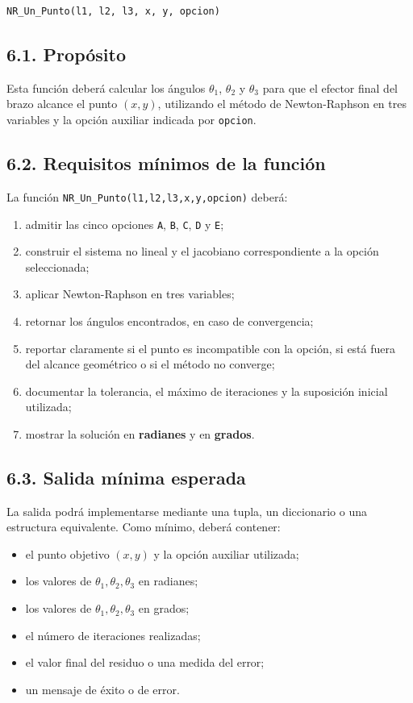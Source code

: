\documentclass[12pt]{article}
\begin{document}
\begin{lstlisting}[language=Python]
NR_Un_Punto(l1, l2, l3, x, y, opcion)
\end{lstlisting}

\subsection*{6.1. Propósito}

Esta función deberá calcular los ángulos \(\theta_1\), \(\theta_2\) y \(\theta_3\) para que el efector final del brazo alcance el punto \((x,y)\), utilizando el método de Newton-Raphson en tres variables y la opción auxiliar indicada por \texttt{opcion}.

\subsection*{6.2. Requisitos mínimos de la función}

La función \texttt{NR\_Un\_Punto(l1,l2,l3,x,y,opcion)} deberá:

\begin{enumerate}[label=\alph*)]
    \item admitir las cinco opciones \texttt{A}, \texttt{B}, \texttt{C}, \texttt{D} y \texttt{E};
    \item construir el sistema no lineal y el jacobiano correspondiente a la opción seleccionada;
    \item aplicar Newton-Raphson en tres variables;
    \item retornar los ángulos encontrados, en caso de convergencia;
    \item reportar claramente si el punto es incompatible con la opción, si está fuera del alcance geométrico o si el método no converge;
    \item documentar la tolerancia, el máximo de iteraciones y la suposición inicial utilizada;
    \item mostrar la solución en \textbf{radianes} y en \textbf{grados}.
\end{enumerate}

\subsection*{6.3. Salida mínima esperada}

La salida podrá implementarse mediante una tupla, un diccionario o una estructura equivalente. Como mínimo, deberá contener:

\begin{itemize}
    \item el punto objetivo \((x,y)\) y la opción auxiliar utilizada;
    \item los valores de \(\theta_1,\theta_2,\theta_3\) en radianes;
    \item los valores de \(\theta_1,\theta_2,\theta_3\) en grados;
    \item el número de iteraciones realizadas;
    \item el valor final del residuo o una medida del error;
    \item un mensaje de éxito o de error.
\end{itemize}
\end{document}
